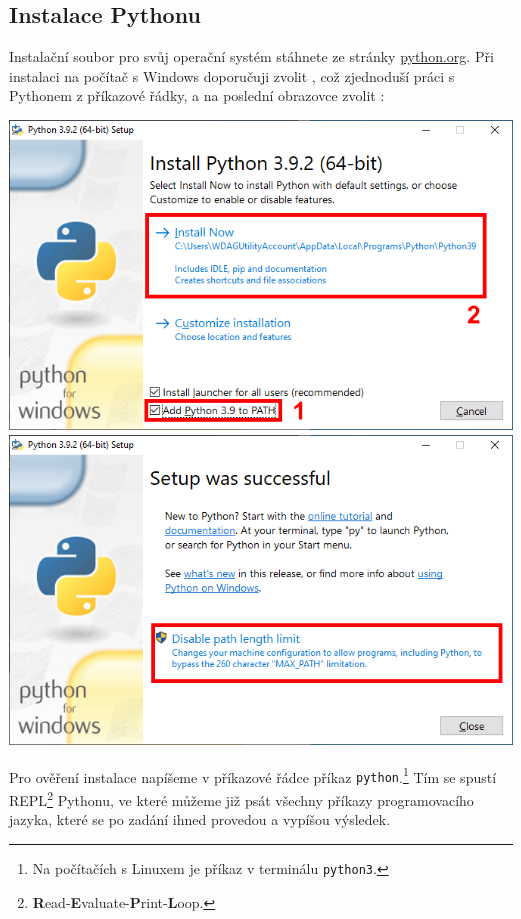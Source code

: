 \documentclass[a4paper,11pt,twoside]{article}
\def\code#1{\textnormal{\texttt{#1}}}
\def\abbreviation#1{\textnormal{\textsc{#1}}}
\theoremstyle{red}
\theoremstyle{green}
\begin{document}
\subsection{Instalace Pythonu}
\label{sec:InstalacePython}
    Instalační soubor pro svůj operační systém stáhnete ze stránky \href{https://python.org}{python.org}.
    Při instalaci na počítač s Windows doporučuji zvolit , což zjednoduší práci s Pythonem z příkazové řádky, a na poslední obrazovce zvolit :
    \begin{center}
        \includegraphics[width=0.495\linewidth]{PythonInstallPath.png}
        \includegraphics[width=0.495\linewidth]{PythonInstallPathLimit.png}
    \end{center}
    Pro ověření instalace napíšeme v příkazové řádce příkaz \code{python}.\footnote{Na počítačích s Linuxem je příkaz v terminálu \code{python3}.}
    Tím se spustí \abbreviation{REPL}\footnote{{\bf R}ead-{\bf E}valuate-{\bf P}rint-{\bf L}oop.} Pythonu, ve které můžeme již psát všechny příkazy programovacího jazyka, které se po zadání ihned provedou a vypíšou výsledek.
\end{document}

